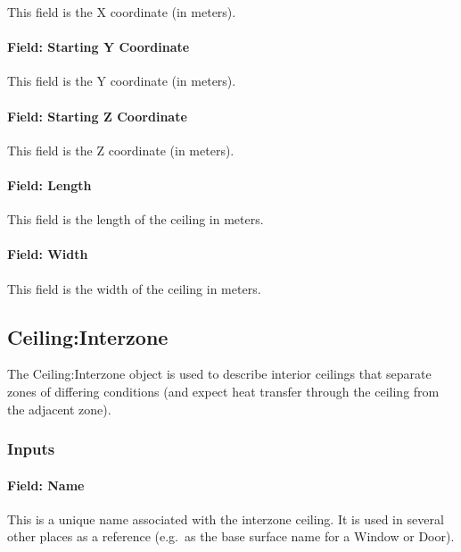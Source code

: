 This field is the X coordinate (in meters).

\paragraph{Field: Starting Y Coordinate}\label{field-starting-y-coordinate-5}

This field is the Y coordinate (in meters).

\paragraph{Field: Starting Z Coordinate}\label{field-starting-z-coordinate-5}

This field is the Z coordinate (in meters).

\paragraph{Field: Length}\label{field-length-5}

This field is the length of the ceiling in meters.

\paragraph{Field: Width}\label{field-width-1}

This field is the width of the ceiling in meters.

\subsection{Ceiling:Interzone}\label{ceilinginterzone}

The Ceiling:Interzone object is used to describe interior ceilings that separate zones of differing conditions (and expect heat transfer through the ceiling from the adjacent zone).

\subsubsection{Inputs}\label{inputs-10-022}

\paragraph{Field: Name}\label{field-name-6-024}

This is a unique name associated with the interzone ceiling. It is used in several other places as a reference (e.g.~as the base surface name for a Window or Door).

